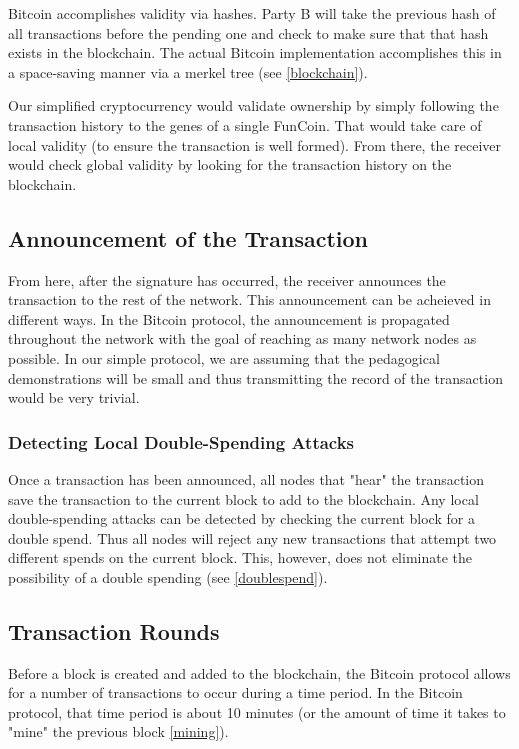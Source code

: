 \documentclass[12pt]{article}
\begin{document}
Bitcoin accomplishes validity via hashes. Party B will take the previous hash of all transactions before the pending one
and check to make sure that that hash exists in the blockchain. The actual Bitcoin implementation accomplishes
this in a space-saving manner via a merkel tree (see \ref{blockchain}).

Our simplified cryptocurrency would validate ownership by simply following the transaction history to the
genes of a single FunCoin. That would take care of local validity (to ensure the transaction is well formed).
From there, the receiver would check global validity by looking for the transaction history on the blockchain.

\subsection{Announcement of the Transaction}
From here, after the signature has occurred, the receiver announces the transaction to the rest of the network.
This announcement can be acheieved in different ways. In the Bitcoin protocol, the announcement is propagated throughout
the network with the goal of reaching as many network nodes as possible. In our simple protocol, we are assuming
that the pedagogical demonstrations will be small and thus transmitting the record of the transaction would be very trivial.

\subsubsection{Detecting Local Double-Spending Attacks}
Once a transaction has been announced, all nodes that "hear" the transaction save the transaction to the current block to
add to the blockchain. Any local double-spending attacks can be detected by checking the current block for a double spend.
Thus all nodes will reject any new transactions that attempt two different spends on the current block. This, however, does
not eliminate the possibility of a double spending (see \ref{doublespend}).

\subsection{Transaction Rounds}
Before a block is created and added to the blockchain, the Bitcoin protocol allows for a number of transactions to occur
during a time period. In the Bitcoin protocol, that time period is about 10 minutes (or the amount of time it takes to "mine"
the previous block \ref{mining}). 
\end{document}
